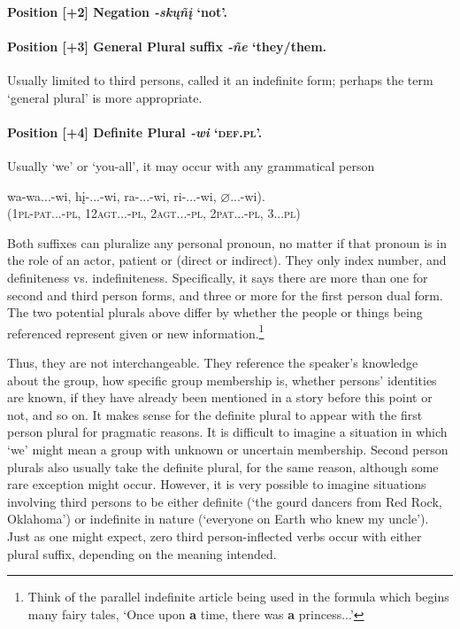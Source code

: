 \documentclass[output=paper]{LSP/langsci}
\begin{document}
\paragraph*{Position [+2]  Negation  \textit{-sk\k{u}ñ\k{i}}  `not'.}	
\noindent
	   	      						     
\paragraph*{Position [+3]  General Plural suffix  \textit{-ñe}  `they/them.} 

Usually limited to third persons, \citet{Whitman1947} called it an indefinite form; perhaps the term `general plural' is more appropriate.  

\noindent
\paragraph*{Position [+4] Definite Plural \textit{-wi}  `\textsc{def.pl}'.}

 Usually `we' or `you-all', it may occur with any grammatical person  
 \begin{exe} 
 \ex \gll wa-wa...-wi, { }  h\k{i}-...-wi, { }     ra-...-wi, { } ri-...-wi, { } $\varnothing$...-wi).  \\
            (1\textsc{pl}-\textsc{pat}...-\textsc{pl}, { } 12\textsc{agt}...-\textsc{pl}, { }    2\textsc{agt}...-\textsc{pl}, { } 2\textsc{pat}...-\textsc{pl}, { } 3...\textsc{pl})  \\
\end{exe}            

Both suffixes can pluralize any personal pronoun, no matter if that pronoun is in the role of an actor, patient or  (direct or indirect).  They only index number, and definiteness vs. indefiniteness.  Specifically, it says there are more than one for second and third person forms, and three or more for the first person dual form. The two potential plurals above differ by whether the people or things being referenced represent given or new information.\footnote{Think of the parallel indefinite article being used in the formula which begins many  fairy tales, `Once upon \textbf{a} time, there was \textbf{a} princess...'}   

Thus, they are not interchangeable.  They reference the speaker's knowledge about the group, how specific group membership is, whether persons' identities are known, if they have already been mentioned in a story before this point or not, and so on.  It makes sense for the definite plural to appear with the first person plural for pragmatic reasons.  It is difficult to imagine a situation in which `we' might mean a group with unknown or uncertain membership.  Second person plurals also usually take the definite plural, for the same reason, although some rare exception might occur.  However, it is very possible to imagine situations involving third persons to be either definite (`the gourd dancers from Red Rock, Oklahoma') or indefinite in nature (`everyone on Earth who knew my uncle').  Just as one might expect, zero third person-inflected verbs occur with either plural suffix, depending on the meaning intended. 
\end{document}
